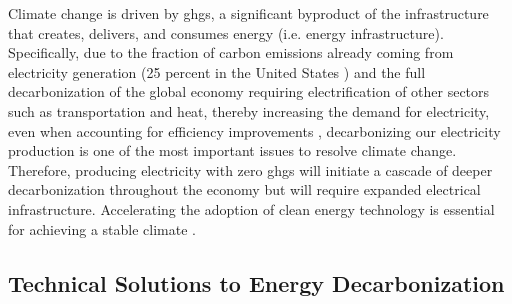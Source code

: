 Climate change is driven by \acp{ghg}, a significant byproduct of the 
infrastructure that creates, delivers, and consumes energy (i.e. energy infrastructure). Specifically, due to the fraction of carbon emissions already coming from electricity generation (25 percent in the United States \cite{us_epa_sources_2020}) and the full decarbonization of the global economy requiring electrification of other sectors such as transportation and heat, thereby increasing the demand for electricity, even when accounting for efficiency improvements \cite{national_academies_of_sciences_engineering_and_medicine_accelerating_2021,
mai_electrification_2018}, decarbonizing our electricity production is one of the most important issues to resolve climate change. Therefore, producing electricity with zero \acp{ghg} will initiate a cascade of deeper decarbonization throughout the economy but will require expanded electrical infrastructure. Accelerating the adoption of clean energy technology is essential for achieving a stable climate \cite{roelfsema_taking_2020, taylor_managing_2021}.

\subsection{Technical Solutions to Energy Decarbonization}

